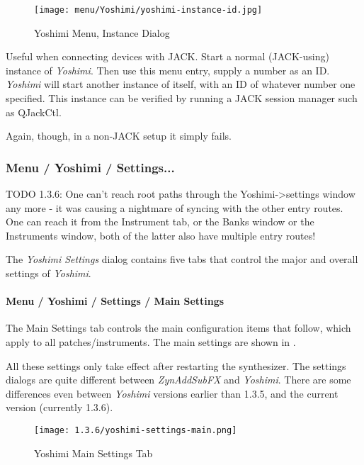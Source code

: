 \begin{figure}[H]
   \centering 
   \texttt{[image: menu/Yoshimi/yoshimi-instance-id.jpg]}
   \caption{Yoshimi Menu, Instance Dialog}
   \label{fig:yoshimi_instance_dialog}
\end{figure}

   Useful when connecting devices with JACK.
   Start a normal (JACK-using) instance of \textsl{Yoshimi}.
   Then use this menu entry, supply a number as an ID.
   \textsl{Yoshimi} will start another instance
   of itself, with an ID of whatever number one specified.
   This instance can be verified by running a JACK session manager such as
   QJackCtl.

   Again, though, in a non-JACK setup it simply fails.  

\subsubsection{Menu / Yoshimi / Settings...}
\label{subsubsec:menu_yoshimi_settings}

TODO 1.3.6:
   One can't reach root paths through the Yoshimi->settings window any more -
   it was causing a nightmare of syncing with the other entry routes. One can
   reach it from the Instrument tab, or the Banks window or the Instruments
   window, both of the latter also have multiple entry routes!

   The \textsl{Yoshimi Settings} dialog contains five tabs that control the
   major and overall settings of \textsl{Yoshimi}.
   
\paragraph{Menu / Yoshimi / Settings / Main Settings}
\label{paragraph:menu_yoshimi_settings_main_settings}

   The Main Settings tab controls the main configuration items that
   follow, which apply to all patches/instruments.
   The main settings are shown in
   .

   All these settings only take effect after restarting the synthesizer.
   The settings dialogs are quite different between \textsl{ZynAddSubFX} and
   \textsl{Yoshimi}.  There are some differences even between
   \textsl{Yoshimi} versions earlier than 1.3.5, and the current version
   (currently 1.3.6).

\begin{figure}[H]
   \centering 
   \texttt{[image: 1.3.6/yoshimi-settings-main.png]}
   \caption{Yoshimi Main Settings Tab}
   \label{fig:yoshimi_main_settings_dialog}
\end{figure}


